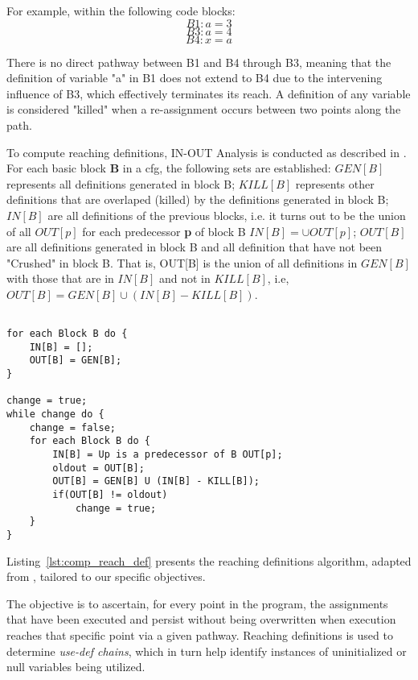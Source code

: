 For example, within the following code blocks:
\[B1: a=3\] 
\[B3: a=4\]
\[B4: x=a\]

There is no direct pathway between B1 and B4 through B3, meaning that the definition of variable "a" in B1 does not extend to B4 due to the intervening influence of B3, which effectively terminates its reach. A definition of any variable is considered "killed" when a re-assignment occurs between two points along the path.

To compute reaching definitions, IN-OUT Analysis is conducted as described in \cite{Alfred_V2007}. For each basic block \textbf{B} in a \gls{cfg}, the following sets are established: \(GEN[B]\) represents all definitions generated in block B; \(KILL[B]\) represents other definitions that are overlaped (killed) by the definitions generated in block B; \(IN[B]\) are all definitions of the previous blocks, i.e. it turns out to be the union of all \(OUT[p]\) for each predecessor \textbf{p} of block B \(IN[B] = \cup OUT[p]\); \(OUT[B]\) are all definitions generated in block B and all definition that have not been "Crushed" in block B. That is, OUT[B] is the union of all definitions in \(GEN[B]\) with those that are in \(IN[B]\) and not in \(KILL[B]\), i.e, $ OUT[B] = GEN[B] \cup  \left(IN[B] - KILL[B]\right) $.\\

\begin{lstlisting}[caption={Algorithm pseudo-code for computing reaching definitions (adapted from \cite{Alfred_V2007})}, label={lst:comp_reach_def}]

for each Block B do {
	IN[B] = [];
	OUT[B] = GEN[B];
}

change = true;
while change do {
	change = false;
	for each Block B do {
		IN[B] = Up is a predecessor of B OUT[p];
		oldout = OUT[B];
		OUT[B] = GEN[B] U (IN[B] - KILL[B]);
		if(OUT[B] != oldout)
			change = true;
	}
}

\end{lstlisting}


Listing~\ref{lst:comp_reach_def} presents the reaching definitions algorithm, adapted from \cite{Alfred_V2007}, tailored to our specific objectives.

The objective is to ascertain, for every point in the program, the assignments that have been executed and persist without being overwritten when execution reaches that specific point via a given pathway. Reaching definitions is used to determine \textit{use-def chains}, which in turn help identify instances of uninitialized or null variables being utilized.

